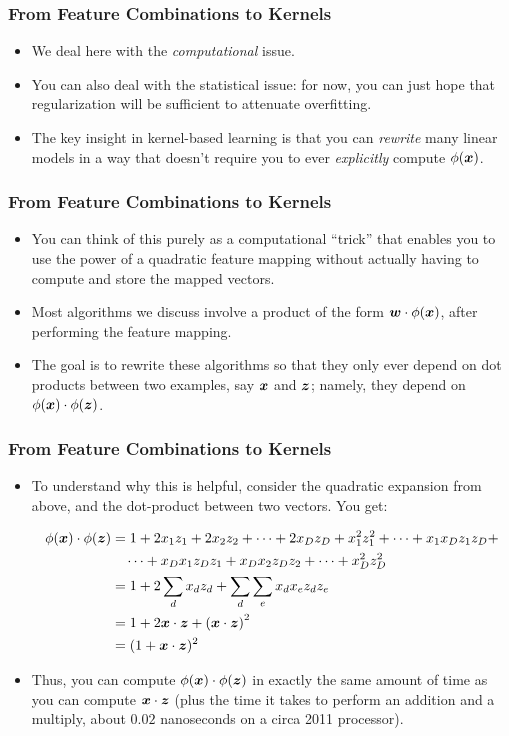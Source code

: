 \documentclass[trans]{beamer}
\begin{document}
\begin{frame}
  \frametitle{From Feature Combinations to Kernels}
\begin{itemize}
\item We deal here  with the \emph{computational} issue.
\item You can also deal with
the statistical issue: for now, you can just hope that regularization
will be sufficient to attenuate overfitting.
\item
The key insight in kernel-based learning is that you can
\emph{rewrite} many linear models in a way that doesn't require you to
ever \emph{explicitly} compute $\phi({\boldsymbol{x}})$. 
\end{itemize}
\end{frame}
\begin{frame}
  \frametitle{From Feature Combinations to Kernels}
\begin{itemize}
\item 
You can
think of this purely as a computational ``trick'' that enables you to
use the power of a quadratic feature mapping without actually having
to compute and store the mapped vectors.  
\item  Most algorithms we discuss involve
a product of the form ${\boldsymbol{w}} \cdot \phi({\boldsymbol{x}})$, after performing the
feature mapping.
\item  The goal is to rewrite these algorithms so that they
only ever depend on dot products between two examples, say ${\boldsymbol{x}}$ and
${\boldsymbol{z}}$; namely, they depend on $\phi({\boldsymbol{x}}) \cdot \phi({\boldsymbol{z}})$.
\end{itemize}
\end{frame}
\begin{frame}
  \frametitle{From Feature Combinations to Kernels}
\begin{itemize}
\item 
  To
understand why this is helpful, consider the quadratic expansion from
above, and the dot-product between two vectors.  You get:
%
\begin{scriptsize}
\begin{align}
\phi({\boldsymbol{x}}) \cdot \phi({\boldsymbol{z}})
&= 1 + 2x_1 z_1 + 2x_2 z_2 + \dots + 2x_D z_D + x_1^2 z_1^2 + \dots + x_1 x_D z_1 z_D + \nonumber\\
&\quad \dots + x_D x_1 z_D z_1 + x_D x_2 z_D z_2 + \dots + x_D^2 z_D^2 \\
&= 1 + 2 \sum_d x_d z_d + \sum_d \sum_e x_d x_e z_d z_e \\
&= 1 + 2 {\boldsymbol{x}} \cdot {\boldsymbol{z}} + \left({\boldsymbol{x}} \cdot {\boldsymbol{z}}\right)^2\\
&= (1 + {\boldsymbol{x}} \cdot {\boldsymbol{z}})^2
\end{align}
\end{scriptsize}
%
\item Thus, you can compute $\phi({\boldsymbol{x}}) \cdot \phi({\boldsymbol{z}})$ in exactly the
same amount of time as you can compute ${\boldsymbol{x}} \cdot {\boldsymbol{z}}$ (plus the
time it takes to perform an addition and a multiply, about $0.02$
nanoseconds on a circa 2011 processor).
\end{itemize}
\end{frame}
\end{document}
